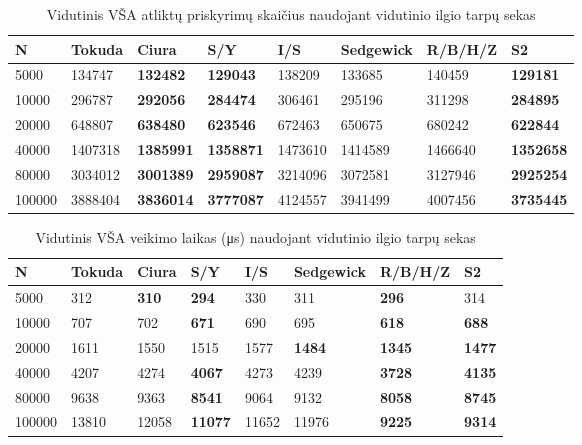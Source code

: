 \documentclass{VUMIFInfKursinis}
\begin{document}
\begin{table}[H]
  \caption{Vidutinis VŠA atliktų priskyrimų skaičius naudojant vidutinio ilgio tarpų sekas}
  \label{tss_medium_assignments}
  \begin{tabular}{|l|l|l|l|l|l|l|l|}
  \hline
  N      & Tokuda  & Ciura            & S/Y              & I/S     & Sedgewick & R/B/H/Z & S2               \\ \hline
  5000   & 134747  & \textbf{132482}  & \textbf{129043}  & 138209  & 133685    & 140459  & \textbf{129181}  \\ \hline
  10000  & 296787  & \textbf{292056}  & \textbf{284474}  & 306461  & 295196    & 311298  & \textbf{284895}  \\ \hline
  20000  & 648807  & \textbf{638480}  & \textbf{623546}  & 672463  & 650675    & 680242  & \textbf{622844}  \\ \hline
  40000  & 1407318 & \textbf{1385991} & \textbf{1358871} & 1473610 & 1414589   & 1466640 & \textbf{1352658} \\ \hline
  80000  & 3034012 & \textbf{3001389} & \textbf{2959087} & 3214096 & 3072581   & 3127946 & \textbf{2925254} \\ \hline
  100000 & 3888404 & \textbf{3836014} & \textbf{3777087} & 4124557 & 3941499   & 4007456 & \textbf{3735445} \\ \hline
  \end{tabular}
\end{table}

\begin{table}[H]
  \caption{Vidutinis VŠA veikimo laikas (μs) naudojant vidutinio ilgio tarpų sekas}
  \label{tss_medium_runtimes}
  \begin{tabular}{|l|l|l|l|l|l|l|l|}
  \hline
  N      & Tokuda & Ciura        & S/Y            & I/S   & Sedgewick     & R/B/H/Z       & S2            \\ \hline
  5000   & 312    & \textbf{310} & \textbf{294}   & 330   & 311           & \textbf{296}  & 314           \\ \hline
  10000  & 707    & 702          & \textbf{671}   & 690   & 695           & \textbf{618}  & \textbf{688}  \\ \hline
  20000  & 1611   & 1550         & 1515           & 1577  & \textbf{1484} & \textbf{1345} & \textbf{1477} \\ \hline
  40000  & 4207   & 4274         & \textbf{4067}  & 4273  & 4239          & \textbf{3728} & \textbf{4135} \\ \hline
  80000  & 9638   & 9363         & \textbf{8541}  & 9064  & 9132          & \textbf{8058} & \textbf{8745} \\ \hline
  100000 & 13810  & 12058        & \textbf{11077} & 11652 & 11976         & \textbf{9225} & \textbf{9314} \\ \hline
  \end{tabular}
\end{table}
\end{document}
